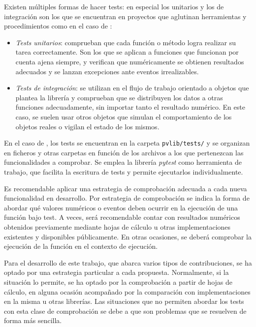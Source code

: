 Existen múltiples formas de hacer tests: en especial los unitarios y los de integración son los que se encuentran en proyectos que aglutinan herramientas y procedimientos como en el caso de \pvlibpy{}:

\begin{itemize}
    \item \textit{Tests unitarios}: comprueban que cada \gls{función} o método logra realizar su tarea correctamente. Son los que se aplican a funciones que funcionan por cuenta ajena siempre, y verifican que numéricamente se obtienen resultados adecuados y se lanzan excepciones ante eventos irrealizables.
    \item \textit{Tests de integración}: se utilizan en el flujo de trabajo orientado a objetos que plantea la librería y comprueban que se distribuyen los datos a otras funciones adecuadamente, sin importar tanto el resultado numérico. En este caso, se suelen usar otros objetos que simulan el comportamiento de los objetos reales o vigilan el estado de los mismos.
\end{itemize}

En el caso de \pvlibpy{}, los tests se encuentran en la carpeta \texttt{pvlib/tests/} y se organizan en ficheros y otras carpetas en función de los archivos a los que pertenezcan las funcionalidades a comprobar. Se emplea la librería \textit{pytest} como herramienta de trabajo, que facilita la escritura de tests y permite ejecutarlos individualmente.

Es recomendable aplicar una \gls{estrategia de comprobación} adecuada a cada nueva funcionalidad en desarrollo. Por estrategia de comprobación se indica la forma de abordar qué valores numéricos o eventos deben ocurrir en la ejecución de una \gls{función} bajo test. A veces, será recomendable contar con resultados numéricos obtenidos previamente mediante \gls{hojas de cálculo} u otras implementaciones existentes y disponibles públicamente. En otras ocasiones, se deberá comprobar la ejecución de la función en el contexto de ejecución.

Para el desarrollo de este trabajo, que abarca varios tipos de contribuciones, se ha optado por una estrategia particular a cada propuesta. Normalmente, si la situación lo permite, se ha optado por la comprobación a partir de hojas de cálculo, en alguna ocasión acompañado por la comparación con implementaciones en la misma u otras librerías. Las situaciones que no permiten abordar los tests con esta clase de comprobación se debe a que son problemas que se resuelven de forma más sencilla.

